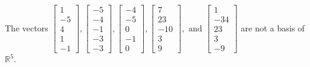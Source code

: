 \begin{exercise}
\begin{exerciseStatement}
  \end{exerciseStatement}
  \begin{exerciseAnswer}
   The vectors \(\left[\begin{array}{r}
1 \\
-5 \\
4 \\
1 \\
-1
\end{array}\right] , \left[\begin{array}{r}
-5 \\
-4 \\
-1 \\
-3 \\
-3
\end{array}\right] , \left[\begin{array}{r}
-4 \\
-5 \\
0 \\
-1 \\
0
\end{array}\right] , \left[\begin{array}{r}
7 \\
23 \\
-10 \\
3 \\
9
\end{array}\right] , \text{ and } \left[\begin{array}{r}
1 \\
-34 \\
23 \\
3 \\
-9
\end{array}\right]\) 
  	 are not  a basis of \(\mathbb{R}^5\).
  


  \end{exerciseAnswer}
\end{exercise}